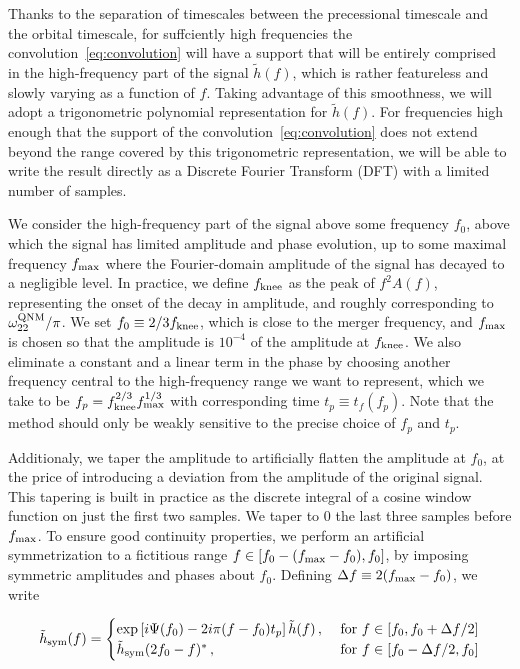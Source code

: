 \documentclass[aps,showpacs,twocolumn,
prd,superscriptaddress,nofootinbib]{revtex4-1}
\newcommand{\be}{\begin{equation}}
\newcommand{\ee}{\end{equation}}
\newcommand{\tf}{t_{f}}
\begin{document}
Thanks to the separation of timescales between the precessional timescale and the orbital timescale, for suffciently high frequencies the convolution~\eqref{eq:convolution} will have a support that will be entirely comprised in the high-frequency part of the signal $\tilde{h}(f)$, which is rather featureless and slowly varying as a function of $f$. Taking advantage of this smoothness, we will adopt a trigonometric polynomial representation for $\tilde{h}(f)$. For frequencies high enough that the support of the convolution~\eqref{eq:convolution} does not extend beyond the range covered by this trigonometric representation, we will be able to write the result directly as a Discrete Fourier Transform (DFT) with a limited number of samples.

We consider the high-frequency part of the signal above some frequency $f_{0}$, above which the signal has limited amplitude and phase evolution, up to some maximal frequency $f_{\rm max}$ where the Fourier-domain amplitude of the signal has decayed to a negligible level. In practice, we define $f_{\rm knee}$ as the peak of $f^{2}A(f)$, representing the onset of the decay in amplitude, and roughly corresponding to $\omega_{22}^{\rm QNM}/\pi$. We set $f_{0}\equiv 2/3f_{\rm knee}$, which is close to the merger frequency, and $f_{\rm max}$ is chosen so that the amplitude is $10^{-4}$ of the amplitude at $f_{\rm knee}$. We also eliminate a constant and a linear term in the phase by choosing another frequency central to the high-frequency range we want to represent, which we take to be $f_{p} = f_{\rm knee}^{2/3} f_{\rm max}^{1/3}$ with corresponding time $t_{p}\equiv \tf(f_{p})$. Note that the method should only be weakly sensitive to the precise choice of $f_{p}$ and $t_{p}$.

Additionaly, we taper the amplitude to artificially flatten the amplitude at $f_{0}$, at the price of introducing a deviation from the amplitude of the original signal. This tapering is built in practice as the discrete integral of a cosine window function on just the first two samples. We taper to 0 the last three samples before $f_{\rm max}$. To ensure good continuity properties, we perform an artificial symmetrization to a fictitious range $f\in [f_{0} - (f_{\rm max} - f_{0}), f_{0}]$, by imposing symmetric amplitudes and phases about $f_{0}$. Defining $\Delta f \equiv 2 (f_{\rm max} - f_{0})$, we write
\begin{widetext}
\be\label{eq:defhsym}
	\tilde{h}_{\rm sym}(f) = 
	\begin{cases} 
		\exp\left[i \Psi(f_{0}) - 2i\pi (f-f_{0}) t_{p} \right] \tilde{h}(f) \,,  &\text{ for } f \in [f_{0}, f_{0} + \Delta f /2] \\
	\tilde{h}_{\rm sym}(2 f_{0} - f)^{*} \,,  &\text{ for } f \in [f_{0} - \Delta f/2, f_{0}]
	\end{cases}
\ee
\end{widetext}
\end{document}
